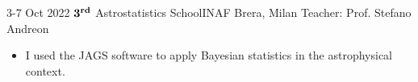%
%
%


\begin{experiences}
  \experience
    {3-7 Oct 2022}   {$\bm{3^{\rm rd}}$ Astrostatistics School}{INAF Brera, Milan}
    {} {Teacher: Prof. Stefano Andreon}{
    \begin{itemize}
        \item I used the JAGS software to apply Bayesian statistics in the astrophysical context.
    \end{itemize}
    }
\end{experiences}